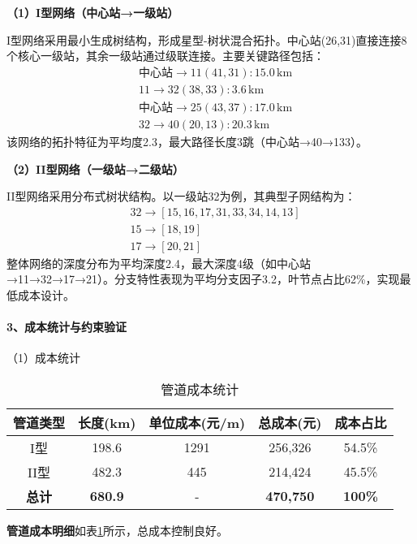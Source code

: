 \documentclass[12pt,a4paper]{article}
\begin{document}
\vspace{1em}
\textbf{（1）I型网络（中心站→一级站）}

I型网络采用最小生成树结构，形成星型-树状混合拓扑。中心站(26,31)直接连接8个核心一级站，其余一级站通过级联连接。主要关键路径包括：
\[
\begin{aligned}
  &\text{中心站} \to 11(41,31) : 15.0\,\text{km} \\
  &11 \to 32(38,33) : 3.6\,\text{km} \\
  &\text{中心站} \to 25(43,37) : 17.0\,\text{km} \\
  &32 \to 40(20,13) : 20.3\,\text{km}
\end{aligned}
\]
该网络的拓扑特征为平均度2.3，最大路径长度3跳（中心站→40→133）。

\vspace{1em}
\textbf{（2）II型网络（一级站→二级站）}

II型网络采用分布式树状结构。以一级站32为例，其典型子网结构为：
\[
\begin{aligned}
  &32 \to [15,16,17,31,33,34,14,13] \\
  &15 \to [18,19] \\
  &17 \to [20,21]
\end{aligned}
\]
整体网络的深度分布为平均深度2.4，最大深度4级（如中心站→11→32→17→21）。分支特性表现为平均分支因子3.2，叶节点占比62\%，实现最低成本设计。

\paragraph{3、成本统计与约束验证}
（1）成本统计\\
\vspace{1em}
\begin{table}[H]
\centering
\caption{管道成本统计}
\label{tab:cost_breakdown}
\begin{tabular}{|c|c|c|c|c|}
\hline
\textbf{管道类型} & \textbf{长度(km)} & \textbf{单位成本(元/m)} & \textbf{总成本(元)} & \textbf{成本占比} \\
\hline
I型 & 198.6 & 1291 & 256,326 & 54.5\% \\
II型 & 482.3 & 445 & 214,424 & 45.5\% \\
\hline
\textbf{总计} & \textbf{680.9} & - & \textbf{470,750} & \textbf{100\%} \\
\hline
\end{tabular}
\end{table}

\vspace{0.5em} %
\textbf{管道成本明细}如表\ref{tab:cost_breakdown}所示，总成本控制良好。
\end{document}
